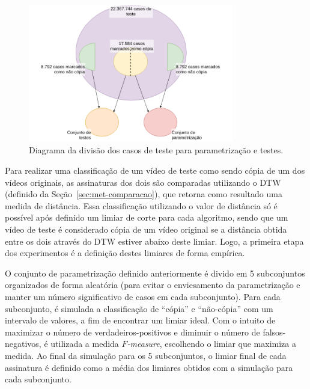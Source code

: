 \begin{figure}[h]
    \centering
    \caption{Diagrama da divisão dos casos de teste para parametrização e testes.}
    \label{fig:casosteste}
  
    \includegraphics[width=0.8\textwidth]{dados/figuras/Casos}
    
    
\end{figure}




Para realizar uma classificação de um vídeo de teste como sendo cópia de um dos vídeos originais, as assinaturas dos dois são comparadas utilizando o DTW (definido da Seção~\ref{sec:met-comparacao}), que retorna como resultado uma medida de distância. Essa classificação utilizando o valor de distância só é possível após definido um limiar de corte para cada algoritmo, sendo que um vídeo de teste é considerado cópia de um vídeo original se a distância obtida entre os dois através do DTW estiver abaixo deste limiar. Logo, a primeira etapa dos experimentos é a definição destes limiares de forma empírica.

O conjunto de parametrização definido anteriormente é divido em 5 subconjuntos organizados de forma aleatória (para evitar o enviesamento da parametrização e manter um número significativo de casos em cada subconjunto). Para cada subconjunto, é simulada a classificação de ``cópia'' e ``não-cópia'' com um intervalo de valores, a fim de encontrar um limiar ideal. Com o intuito de maximizar o número de verdadeiros-positivos e diminuir o número de falsos-negativos, é utilizada a medida \textit{$F$-measure}, escolhendo o limiar que maximiza a medida. Ao final da simulação para os 5 subconjuntos, o limiar final de cada assinatura é definido como a média dos limiares obtidos com a simulação para cada subconjunto.

